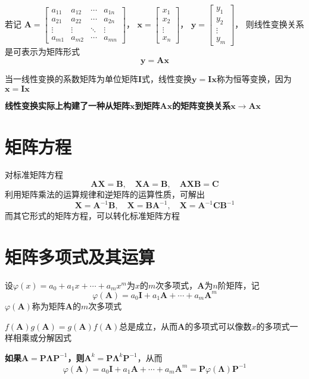\documentclass[UTF8]{ctexart}
\newcommand{\ve}[1]{{\bm{#1}}}
\newcommand{\mat}[1]{\ve{#1}}
\newcommand{\emplin}{\vspace{1em}}
\begin{document}
若记
$\displaystyle\mat{A}=\begin{bmatrix}
a_{11}&a_{12}&\cdots&a_{1n}\\
a_{21}&a_{22}&\cdots&a_{2n}\\
\vdots&\vdots&\ddots&\vdots\\
a_{m1}&a_{m2}&\cdots&a_{mn}
\end{bmatrix}$，
$\displaystyle\mat{x}=\begin{bmatrix}
x_1\\
x_2\\
\vdots\\
x_n
\end{bmatrix}$，
$\displaystyle\mat{y}=\begin{bmatrix}
y_1\\
y_2\\
\vdots\\
y_m
\end{bmatrix}$，
则线性变换关系是可表示为矩阵形式
\[\mat{y}=\mat{A}\mat{x}\]

当一线性变换的系数矩阵为单位矩阵$\mat{I}$式，线性变换$\mat{y}=\mat{I}\mat{x}$称为恒等变换，因为$\mat{x}=\mat{I}\mat{x}$

\textbf{线性变换实际上构建了一种从矩阵$\mat{x}$到矩阵$\mat{A}\mat{x}$的矩阵变换关系$\mat{x}\to\mat{A}\mat{x}$}

\section*{矩阵方程}
对标准矩阵方程
\[\mat{A}\mat{X}=\mat{B},\quad\mat{X}\mat{A}=\mat{B},\quad\mat{A}\mat{X}\mat{B}=\mat{C}\]
利用矩阵乘法的运算规律和逆矩阵的运算性质，可解出
\[\mat{X}=\mat{A}^{-1}\mat{B},\quad\mat{X}=\mat{B}\mat{A}^{-1},\quad\mat{X}=\mat{A}^{-1}\mat{C}\mat{B}^{-1}\]
而其它形式的矩阵方程，可以转化标准矩阵方程

\section*{矩阵多项式及其运算}
设$\varphi(x)=a_0+a_1x+\cdots+a_mx^m$为$x$的$m$次多项式，$\mat{A}$为$n$阶矩阵，记
\[\varphi(\mat{A})=a_0\mat{I}+a_1\mat{A}+\cdots+a_m\mat{A}^m\]
$\varphi(\mat{A})$称为矩阵$\mat{A}$的$m$次多项式

\emplin

$f(\mat{A})g(\mat{A})=g(\mat{A})f(\mat{A})$总是成立，从而$\mat{A}$的多项式可以像数$x$的多项式一样相乘或分解因式

\emplin

\textbf{如果$\mat{A}=\mat{P}\mat{\Lambda}\mat{P}^{-1}$，则$\mat{A}^k=\mat{P}\mat{\Lambda}^k\mat{P}^{-1}$}，从而
\[\varphi(\mat{A})=a_0\mat{I}+a_1\mat{A}+\cdots+a_m\mat{A}^m=\mat{P}\varphi(\mat{\Lambda})\mat{P}^{-1}\]
\end{document}

